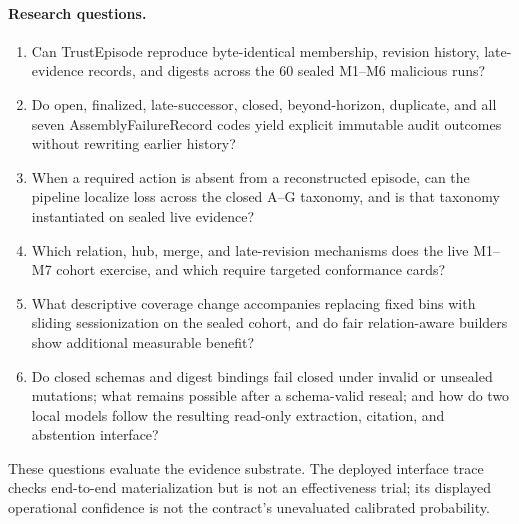 \paragraph{Research questions.}
\begin{enumerate}
  \item[\textbf{RQ1}] Can TrustEpisode reproduce byte-identical membership, revision history,
      late-evidence records, and digests across the 60 sealed M1--M6 malicious runs?
  \item[\textbf{RQ2}] Do open, finalized, late-successor, closed, beyond-horizon, duplicate, and
        all seven AssemblyFailureRecord codes yield explicit immutable audit outcomes without
        rewriting earlier history?
  \item[\textbf{RQ3}] When a required action is absent from a reconstructed episode, can the
        pipeline localize loss across the closed A--G taxonomy, and is that taxonomy instantiated
        on sealed live evidence?
  \item[\textbf{RQ4}] Which relation, hub, merge, and late-revision mechanisms does the live
        M1--M7 cohort exercise, and which require targeted conformance cards?
  \item[\textbf{RQ5}] What descriptive coverage change accompanies replacing fixed bins with
        sliding sessionization on the sealed cohort, and do fair relation-aware builders show
        additional measurable benefit?
  \item[\textbf{RQ6}] Do closed schemas and digest bindings fail closed under invalid or unsealed
        mutations; what remains possible after a schema-valid reseal; and how do two local models
        follow the resulting read-only extraction, citation, and abstention interface?
\end{enumerate}
These questions evaluate the evidence substrate. The deployed interface trace checks end-to-end
materialization but is not an effectiveness trial; its displayed operational confidence is not the
contract's unevaluated calibrated probability.


